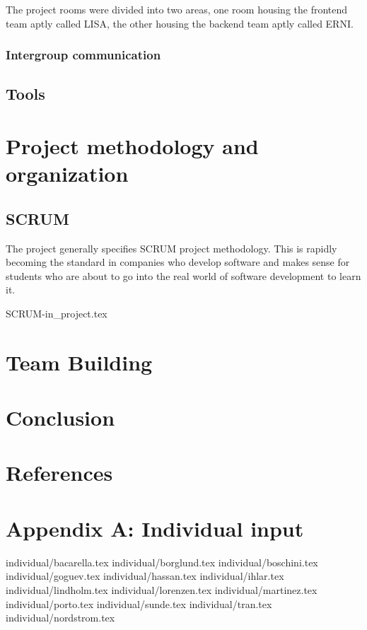 \documentclass[11pt]{report}
\begin{document}
The project rooms were divided into two areas, one room housing the frontend team aptly called LISA, the other housing the backend team aptly called ERNI. 


\subsection{Intergroup communication}

\section{Tools}



\chapter{Project methodology and organization}
\section{SCRUM}

The project generally specifies SCRUM project methodology. This is rapidly becoming the standard in companies who develop software and makes sense for students who are about to go into the real world of software development to learn it.





 {SCRUM-in_project.tex}


\chapter{Team Building}

\chapter{Conclusion}


\chapter{References}

\chapter{Appendix A: Individual input}

 {individual/bacarella.tex}
 {individual/borglund.tex}
 {individual/boschini.tex}
 {individual/goguev.tex}
 {individual/hassan.tex}
 {individual/ihlar.tex}
 {individual/lindholm.tex}
 {individual/lorenzen.tex}
 {individual/martinez.tex}
 {individual/porto.tex}
 {individual/sunde.tex}
 {individual/tran.tex}
 {individual/nordstrom.tex}
\end{document}
